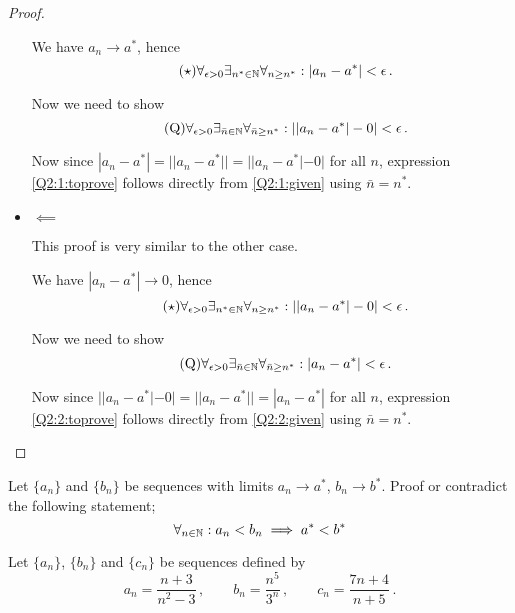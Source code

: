 \documentclass[week=2]{homework}
\begin{document}
\begin{questions}
\begin{proof}
\begin{itemize}
	    		We have $a_n \to a^*$, hence
	    		\begin{equation} \label{Q2:1:given} \tag{$\star$}
		    		\forall_{\epsilon > 0}\exists_{n^* \in \naturals}\forall_{n \geq n^*}: |a_n - a^*| < \epsilon\,.
	    		\end{equation}
	    		
	    		Now we need to show
	    		\begin{equation} \label{Q2:1:toprove} \tag{Q}
		    		\forall_{\epsilon > 0}\exists_{\bar n \in \naturals}\forall_{\bar n \geq n^*}: ||a_n - a^*|-0| < \epsilon\,.
	    		\end{equation}
	    		
	    		Now since $|a_n - a^*| = ||a_n - a^*|| = ||a_n - a^*|-0|$ for all $n$, expression \ref{Q2:1:toprove} follows directly from \ref{Q2:1:given} using $\bar n = n^*$.
	    		
	    		\item $\impliedby$
	    		
	    		This proof is very similar to the other case.
	    		
	    		We have $|a_n-a^*| \to 0$, hence
	    		\begin{equation} \label{Q2:2:given} \tag{$\star$}
	    		\forall_{\epsilon > 0}\exists_{n^* \in \naturals}\forall_{n \geq n^*}: ||a_n - a^*|-0| < \epsilon\,.
	    		\end{equation}
	    		
	    		Now we need to show
	    		\begin{equation} \label{Q2:2:toprove} \tag{Q}
	    		\forall_{\epsilon > 0}\exists_{\bar n \in \naturals}\forall_{\bar n \geq n^*}: |a_n - a^*| < \epsilon\,.
	    		\end{equation}
	    		
	    		Now since $||a_n - a^*|-0| = ||a_n - a^*|| = |a_n - a^*|$ for all $n$, expression \ref{Q2:2:toprove} follows directly from \ref{Q2:2:given} using $\bar n = n^*$.
	    	\end{itemize}
	    \end{proof}
    
	    \question
	    Let $\{a_n\}$ and $\{b_n\}$ be sequences with limits $a_n \to a^*$, $b_n \to b^*$.
	    Proof or contradict the following statement;
	    \[
		    \forall_{n \in \mathbb{N}}: a_n < b_n \implies a^* < b^*
	    \]
	    
	    
	    \question
	    Let $\{a_n\}$, $\{b_n\}$ and $\{c_n\}$ be sequences defined by
	    \[
		    a_n = \frac{n+3}{n^2-3}\,,\qquad b_n = \frac{n^5}{3^n}\,,\qquad c_n = \frac{7n+4}{n+5}\,.
	    \]
	    

\end{questions}
\end{document}
